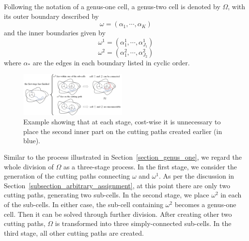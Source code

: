 \documentclass[conference]{IEEEtran}
\begin{document}
Following the notation of a genus-one cell, a genus-two cell is denoted by $\Omega$, with its outer boundary described by 
\begin{equation}
\label{equ_omega_genus_two}
\omega = (\alpha_1, \cdots, \alpha_K)
\end{equation}
and the inner boundaries given by
\begin{equation}
\label{equ_omega_genus_two_1}
\omega^1 = (\alpha^1_1, \cdots, \alpha^1_{J_1})
\end{equation}
\begin{equation}
\label{equ_omega_genus_two_2}
\omega^2 = (\alpha^2_1, \cdots, \alpha^2_{J_2})
\end{equation}
where $\alpha_*$ are the edges in each boundary listed in cyclic order. 

\begin{figure}[t]
\centering
\includegraphics[width = 0.48\textwidth]{figures/proof/fig_no_on_cutting_path}
\caption{Example showing that at each stage, cost-wise it is unnecessary to place the second inner part on the 
cutting paths created earlier (in blue).}
\label{fig_no_on_cutting_path}
\end{figure}

Similar to the process illustrated in 
Section~\ref{section_genus_one}, 
we regard the whole division of $\Omega$ as a three-stage process. In the first stage, we consider the generation of the cutting paths connecting $\omega$ and $\omega^1$. As per the discussion in 
Section~\ref{subsection_arbitrary_assignment}, at this point there are only two cutting paths, generating two sub-cells. In the second stage, we place $\omega^2$ in each of the sub-cells. In either case, the sub-cell containing $\omega^2$ becomes a genus-one cell. Then it can be solved through further division. After creating other two cutting paths, $\Omega$ is transformed into three simply-connected sub-cells. In the third stage, all other cutting paths are created. 
\end{document}
